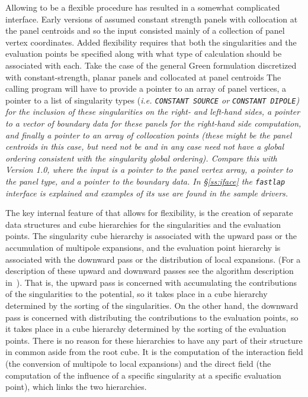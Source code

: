 Allowing \fas to be a flexible procedure has resulted in 
a somewhat complicated interface.  Early versions of \fas 
assumed constant strength panels with collocation at the panel 
centroids and so the input consisted mainly of a collection of
panel vertex coordinates.  Added flexibility requires that both
the singularities and the evaluation points be specified along 
with what type of calculation should be associated with each.
Take the case of the general Green formulation discretized with 
constant-strength, planar panels and collocated at panel centroids
The calling program
will have to provide a pointer to an array of panel vertices, a pointer to
a list of singularity types (\it i.e. \rm {\tt CONSTANT SOURCE} 
or {\tt CONSTANT DIPOLE}) for the inclusion of these singularities on 
the right- and left-hand sides,  a pointer to a vector of boundary data 
for these panels for the right-hand side computation, 
and finally a pointer to an array of collocation points (these might be the
panel centroids in this case, but need not be and in any case need not
have a global ordering consistent with the singularity global ordering).
Compare this with Version 1.0, where the input is a pointer to the panel
vertex array, a pointer to the panel type, and a pointer to the boundary 
data.   In \S\ref{ss:iface} the  {\tt fastlap} interface 
is explained and examples of its use are found in the sample drivers.

The key internal feature of \fas that allows for flexibility, 
is the creation of separate data structures and cube hierarchies
for the singularities and the evaluation points.
The singularity cube hierarchy is associated with the upward pass or the
accumulation of multipole expansions, and the evaluation point
hierarchy  is associated with the downward pass or the distribution 
of local expansions.
(For a description of these upward and downward passes see the algorithm 
description in~\cite{nabors94}).  That is, the upward pass is concerned
with accumulating the contributions of the singularities to the potential,
so it takes place in a cube hierarchy determined by the sorting of the 
singularities.  On the other hand, the downward
pass is concerned with distributing the contributions to the 
evaluation points, so it takes place in a cube hierarchy determined 
by the sorting of the evaluation points.  There is no reason for these 
hierarchies to have any part of their structure in common aside from the 
root cube.  It is the computation of the interaction field (the 
conversion of multipole to local expansions) and the direct field 
(the computation of the influence of a specific singularity at a 
specific evaluation point), which links the two hierarchies.


